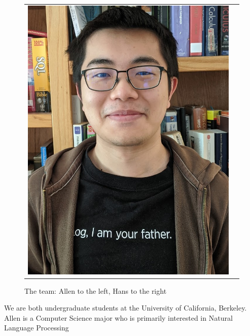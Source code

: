 \documentclass[conference, 12pt, onecolumn]{IEEEtran}
\begin{document}
\begin{figure}[h!]
\begin{tabular}{ll}
\includegraphics[scale=.25]{mao.jpg} %
\end{tabular}
\captionsetup{labelformat=empty}
\caption{The team: Allen to the left, Hans to the right}
\end{figure}
We are both undergraduate students at the University of California, Berkeley. Allen is a Computer Science major who is primarily interested in Natural Language Processing
\end{document}
